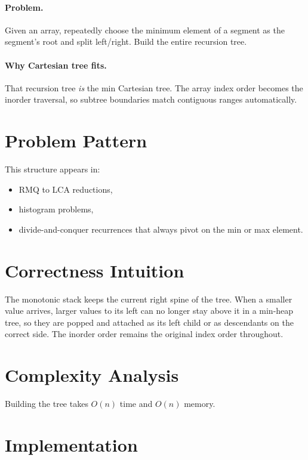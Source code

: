 \paragraph{Problem.}
Given an array, repeatedly choose the minimum element of a segment as the segment's root and split left/right. Build the
entire recursion tree.

\paragraph{Why Cartesian tree fits.}
That recursion tree \emph{is} the min Cartesian tree. The array index order becomes the inorder traversal, so subtree
boundaries match contiguous ranges automatically.

\section*{Problem Pattern}

This structure appears in:

\begin{itemize}
  \item RMQ to LCA reductions,
  \item histogram problems,
  \item divide-and-conquer recurrences that always pivot on the min or max element.
\end{itemize}

\section*{Correctness Intuition}

The monotonic stack keeps the current right spine of the tree. When a smaller value arrives, larger values to its left
can no longer stay above it in a min-heap tree, so they are popped and attached as its left child or as descendants on
the correct side. The inorder order remains the original index order throughout.

\section*{Complexity Analysis}

Building the tree takes \(O(n)\) time and \(O(n)\) memory.

\section*{Implementation}


